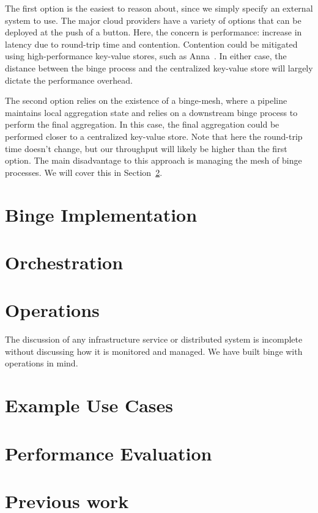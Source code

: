 \documentclass[10pt,twocolumn]{article}
\begin{document}
The first option is the easiest to reason about, since we simply specify an
external system to use.  The major cloud providers have a variety of options
that can be deployed at the push of a button.  Here, the concern is
performance: increase in latency due to round-trip time and contention.
Contention could be mitigated using high-performance key-value stores, such as
Anna~\cite{ANNA}.  In either case, the distance between the binge process and
the centralized key-value store will largely dictate the performance overhead.

The second option relies on the existence of a binge-mesh, where a pipeline
maintains local aggregation state and relies on a downstream binge process to
perform the final aggregation.  In this case, the final aggregation could be
performed closer to a centralized key-value store.  Note that here the
round-trip time doesn't change, but our throughput will likely be higher than
the first option.  The main disadvantage to this approach is managing the mesh
of binge processes.  We will cover this in Section~\ref{sec:orchestration}.

\section{Binge Implementation}\label{binge:implementation}
\section{Orchestration}\label{sec:orchestration}
\section{Operations}\label{sec:operations}

The discussion of any infrastructure service or distributed system is incomplete
without discussing how it is monitored and managed.  We have built binge with
operations in mind.

\section{Example Use Cases}\label{usecases}
\section{Performance Evaluation}\label{evaluation}
\section{Previous work}\label{previous:work}
\end{document}
